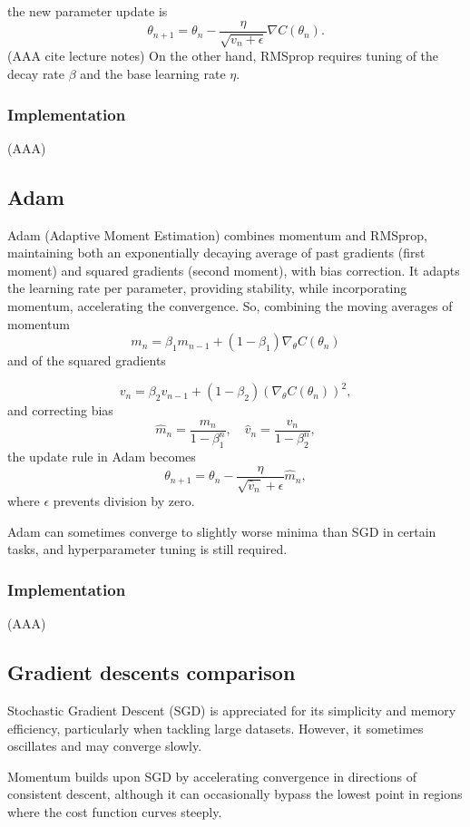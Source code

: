 \documentclass[
 reprint,            %
 amsmath,amssymb,
 aps,
]{revtex4-2}
\begin{document}
the new parameter update is
\[\theta_{n+1} = \theta_n - \frac{\eta}{\sqrt{v_n + \epsilon}} \nabla C(\theta_n).
\]
(AAA cite lecture notes)
On the other hand, RMSprop requires tuning of the decay rate \(\beta\) and the base learning rate \(\eta\).

\subsubsection{Implementation}
(AAA)

\subsection{Adam}
Adam (Adaptive Moment Estimation) combines momentum and RMSprop, maintaining both an exponentially decaying average of past gradients (first moment) and squared gradients (second moment), with bias correction\cite{hjorthjensen_week37}. It adapts the learning rate per parameter, providing stability, while incorporating momentum, accelerating the convergence.
So, combining the moving averages of momentum
\[
m_n = \beta_1 m_{n-1} + (1-\beta_1) \nabla_\theta C(\theta_n)
\]  
and of the squared gradients

\[
v_n = \beta_2 v_{n-1} + (1-\beta_2) (\nabla_\theta C(\theta_n))^2,
\]  
and correcting bias
\[
\hat{m}_n = \frac{m_n}{1-\beta_1^n}, \quad \hat{v}_n = \frac{v_n}{1-\beta_2^n},
\]  
the update rule in Adam becomes
\[
\theta_{n+1} = \theta_n - \frac{\eta}{\sqrt{\hat{v}_n}+\epsilon} \hat{m}_n,
\]  
where \(\epsilon\) prevents division by zero.

Adam can sometimes converge to slightly worse minima than SGD in certain tasks, and hyperparameter tuning is still required.
\subsubsection{Implementation}
(AAA)

\subsection{Gradient descents comparison}
Stochastic Gradient Descent (SGD) is appreciated for its simplicity and memory efficiency, particularly when tackling large datasets. However, it sometimes oscillates and may converge slowly. 

Momentum builds upon SGD by accelerating convergence in directions of consistent descent, although it can occasionally bypass the lowest point in regions where the cost function curves steeply. 
\end{document}
